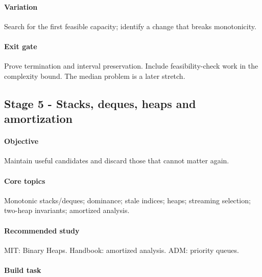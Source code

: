 \documentclass[11pt,letterpaper]{article}
\begin{document}
\paragraph*{Variation}

Search for the first feasible capacity; identify a change that breaks monotonicity.

\paragraph*{Exit gate}

Prove termination and interval preservation. Include feasibility-check work in the complexity bound. The median problem is a later stretch.

\par{}
\begin{samepage}
\section{Stage 5 - Stacks, deques, heaps and amortization}\label{sec:9}

\label{stage:5}


\paragraph*{Objective}

Maintain useful candidates and discard those that cannot matter again.

\end{samepage}

\paragraph*{Core topics}

Monotonic stacks/deques; dominance; stale indices; heaps; streaming selection; two-heap invariants; amortized analysis.

\paragraph*{Recommended study}

MIT: Binary Heaps. Handbook: amortized analysis. ADM: priority queues.

\paragraph*{Build task}
\end{document}
